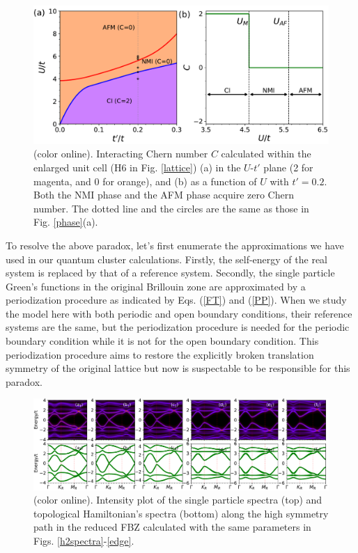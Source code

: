 \documentclass[12pt]{iopart}
\begin{document}
\begin{figure}
\centering
\includegraphics[scale=0.6]{h6chernnumber}
\caption{(color online). Interacting Chern number $C$ calculated within the enlarged unit cell (H6 in Fig. \ref{lattice}) (a) in the $U$-$t'$ plane (2 for magenta, and 0 for orange), and (b) as a function of $U$ with $t'=0.2$. Both the NMI phase and the AFM phase acquire zero Chern number. The dotted line and the circles are the same as those in Fig. \ref{phase}(a).}\label{h6chernnumber}
\end{figure}

\par To resolve the above paradox, let's first enumerate the approximations we have used in our quantum cluster calculations. Firstly, the self-energy of the real system is replaced by that of a reference system. Secondly, the single particle Green's functions in the original Brillouin zone are approximated by a periodization procedure as indicated by Eqs. (\ref{FT}) and (\ref{PP}). When we study the model here with both periodic and open boundary conditions, their reference systems are the same, but the periodization procedure is needed for the periodic boundary condition while it is not for the open boundary condition. This periodization procedure aims to restore the explicitly broken translation symmetry of the original lattice but now is suspectable to be responsible for this paradox.

\begin{figure}
\centering
\includegraphics[scale=0.45]{h6spectra}
\caption{(color online). Intensity plot of the single particle spectra (top) and topological Hamiltonian's spectra (bottom) along the high symmetry path in the reduced FBZ calculated with the same parameters in Figs. \ref{h2spectra}-\ref{edge}.}\label{h6spectra}
\end{figure}
\end{document}
